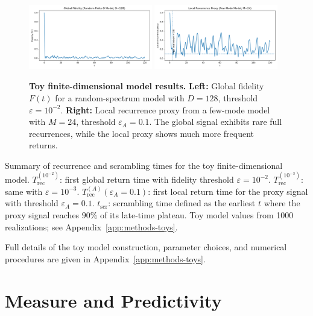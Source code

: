 \documentclass[12pt]{article}
\newcommand{\Trec}{T_{\text{rec}}}
\newcommand{\TrecA}{T^{(A)}_{\text{rec}}}
\newcommand{\tscr}{t_{\text{scr}}}
\theoremstyle{remark}
\begin{document}
\begin{figure}[htbp]
    \centering
    \includegraphics[width=0.48\textwidth]{figs/fig_spin_fidelity.png}
    \includegraphics[width=0.48\textwidth]{figs/fig_spin_localrec.png}
    \caption{
\textbf{Toy finite-dimensional model results.} 
\textbf{Left:} Global fidelity $F(t)$ for a random-spectrum model with $D=128$, threshold $\varepsilon=10^{-2}$. 
\textbf{Right:} Local recurrence proxy from a few-mode model with $M=24$, threshold $\varepsilon_A=0.1$.
The global signal exhibits rare full recurrences, while the local proxy shows much more frequent returns.
    }
    \label{fig:toy_models}
\end{figure}

\begin{table}[htbp]
    \centering
    
    \caption{
Summary of recurrence and scrambling times for the toy finite-dimensional model.  
$\Trec^{(10^{-2})}$: first global return time with fidelity threshold $\varepsilon = 10^{-2}$.  
$\Trec^{(10^{-3})}$: same with $\varepsilon = 10^{-3}$.  
$\TrecA(\varepsilon_A=0.1)$: first local return time for the proxy signal with threshold $\varepsilon_A = 0.1$.  
$\tscr$: scrambling time defined as the earliest $t$ where the proxy signal reaches $90\%$ of its late-time plateau.
Toy model values from 1000 realizations; see Appendix~\ref{app:methods-toys}.
    }
    \label{tab:toy_summary}
\end{table}

Full details of the toy model construction, parameter choices, and numerical procedures are given in Appendix~\ref{app:methods-toys}.



\section{Measure and Predictivity}\label{sec:measure}
\end{document}
